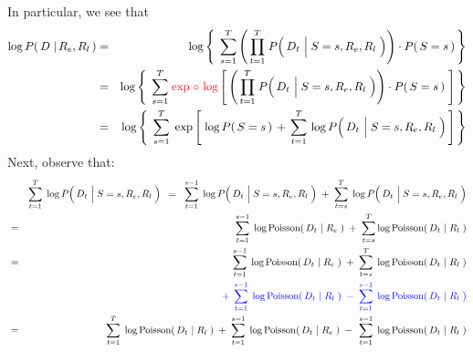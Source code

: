 In particular, we see that
\begin{eqnarray*}
\log P\!\left(\,D \;\vert\, R_{e},R_{l}\,\right)
&=&
	\log\left\{\;\,
		\overset{T}{\underset{s=1}{\sum}}
		\left(\,
			\overset{T}{\underset{t=1}{\prod}}\;
			P\!\left(\,D_{t} \,\left\vert\; S\overset{{\color{white}1}}{=}s,R_{e},R_{l}\right.\,\right)
			\right)
		\cdot
		P\!\left(\,S=s\,\right)
		\,\right\}
\\
& = &
	\log\left\{\;\,
	\overset{T}{\underset{s=1}{\sum}}\;
	{\color{red}\exp\,\circ\,\log}\left[\,
		\left(\,
			\overset{T}{\underset{t=1}{\prod}}\;
			P\!\left(\,D_{t} \,\left\vert\; S\overset{{\color{white}1}}{=}s,R_{e},R_{l}\right.\,\right)
			\right)
		\cdot
		P\!\left(\,S=s\,\right)
		\;\right]
	\,\right\}
\\
& = &
	\log\left\{\;\,
	\overset{T}{\underset{s=1}{\sum}}\;
	\exp\left[\;\log P\!\left(\,S=s\,\right)
			\, + \,
			\overset{T}{\underset{t=1}{\sum}}\,
				\log P\!\left(\,D_{t} \,\left\vert\; S\overset{{\color{white}1}}{=}s,R_{e},R_{l}\right.\,\right)
		\,\right]
	\,\right\}
\end{eqnarray*}
Next, observe that:
\begin{eqnarray*}
&&
	\overset{T}{\underset{t=1}{\sum}}\;
	\log P\!\left(\,D_{t} \,\left\vert\; S\overset{{\color{white}1}}{=}s,R_{e},R_{l}\right.\,\right)
\;\; = \;\;
	\overset{s-1}{\underset{t=1}{\sum}}\;
	\log P\!\left(\,D_{t} \,\left\vert\; S\overset{{\color{white}1}}{=}s,R_{e},R_{l}\right.\,\right)
	\; + \;
	\overset{T}{\underset{t=s}{\sum}}\;
	\log P\!\left(\,D_{t} \,\left\vert\; S\overset{{\color{white}1}}{=}s,R_{e},R_{l}\right.\,\right)
\\
&=&
	\overset{s-1}{\underset{t=1}{\sum}}\;
	\log\textnormal{Poisson}\!\left(\,D_{t} \,\left\vert\; R_{e}\right.\,\right)
	\; + \;
	\overset{T}{\underset{t=s}{\sum}}
	\log\textnormal{Poisson}\!\left(\,D_{t} \,\left\vert\; R_{l}\right.\,\right)
\\
&=&
	{\color{white}+}\;\,
	\overset{s-1}{\underset{t=1}{\sum}}\;
	\log\textnormal{Poisson}\!\left(\,D_{t} \,\left\vert\; R_{e}\right.\,\right)
	\; + \;
	\overset{T}{\underset{t=s}{\sum}}\;
	\log\textnormal{Poisson}\!\left(\,D_{t} \,\left\vert\; R_{l}\right.\,\right)
\\
&&
	{\color{blue}
	+\;\,
	\overset{s-1}{\underset{t=1}{\sum}}\;
	\log\textnormal{Poisson}\!\left(\,D_{t} \,\left\vert\; R_{l}\right.\,\right)
	\; - \;
	\overset{s-1}{\underset{t=1}{\sum}}\;
	\log\textnormal{Poisson}\!\left(\,D_{t} \,\left\vert\; R_{l}\right.\,\right)
	}
\\
&=&
	\overset{T}{\underset{t=1}{\sum}}\;
	\log\textnormal{Poisson}\!\left(\,D_{t} \,\left\vert\; R_{l}\right.\,\right)
	\;+\;
	\overset{s-1}{\underset{t=1}{\sum}}\;
	\log\textnormal{Poisson}\!\left(\,D_{t} \,\left\vert\; R_{e}\right.\,\right)
		\;-\;\,
		\overset{s-1}{\underset{t=1}{\sum}}\;
		\log\textnormal{Poisson}\!\left(\,D_{t} \,\left\vert\; R_{l}\right.\,\right)
\end{eqnarray*}
